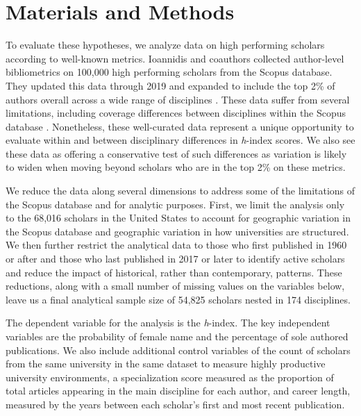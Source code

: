 \documentclass[
  10pt,
  letterpaper,
]{article}
\begin{document}
\section{Materials and Methods}\label{materials-and-methods}

To evaluate these hypotheses, we analyze data on high performing
scholars according to well-known metrics. Ioannidis and coauthors
\citep{ioannidis_standardized_2019} collected author-level bibliometrics
on 100,000 high performing scholars from the Scopus database. They
updated this data through 2019 and expanded to include the top 2\% of
authors overall across a wide range of disciplines
\citep{ioannidis_updated_2020}. These data suffer from several
limitations, including coverage differences between disciplines within
the Scopus database \citep{mongeon_journal_2016, singh_journal_2021}.
Nonetheless, these well-curated data represent a unique opportunity to
evaluate within and between disciplinary differences in \emph{h}-index
scores. We also see these data as offering a conservative test of such
differences as variation is likely to widen when moving beyond scholars
who are in the top 2\% on these metrics.

We reduce the data along several dimensions to address some of the
limitations of the Scopus database and for analytic purposes. First, we
limit the analysis only to the 68,016 scholars in the United States to
account for geographic variation in the Scopus database and geographic
variation in how universities are structured. We then further restrict
the analytical data to those who first published in 1960 or after and
those who last published in 2017 or later to identify active scholars
and reduce the impact of historical, rather than contemporary, patterns.
These reductions, along with a small number of missing values on the
variables below, leave us a final analytical sample size of 54,825
scholars nested in 174 disciplines.

The dependent variable for the analysis is the \emph{h}-index. The key
independent variables are the probability of female name and the
percentage of sole authored publications. We also include additional
control variables of the count of scholars from the same university in
the same dataset to measure highly productive university environments, a
specialization score measured as the proportion of total articles
appearing in the main discipline for each author, and career length,
measured by the years between each scholar's first and most recent
publication.
\end{document}
